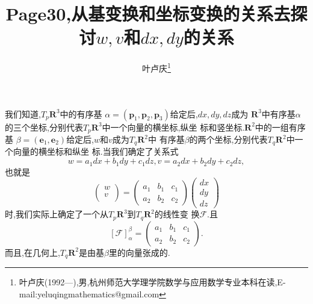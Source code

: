 \documentclass[a4paper]{article}
\begin{document}
\title{\huge{\bf{Page30,从基变换和坐标变换的关系去探讨$w,v$和$dx,dy$的关系}}} \author{\small{叶卢庆\footnote{叶卢庆(1992---),男,杭州师范大学理学院数学与应用数学专业本科在读,E-mail:yeluqingmathematics@gmail.com}}}
\maketitle
我们知道,$T_{p}\mathbf{R}^{3}$中的有序基
$\alpha=(\mathbf{p}_{1},\mathbf{p}_{2},\mathbf{p}_3)$给定后,$dx,dy,dz$成为
$\mathbf{R}^3$中有序基$\alpha$的三个坐标,分别代表$T_p\mathbf{R}^{3}$中一个向量的横坐标,纵坐
标和竖坐标.$\mathbf{R}^2$中的一组有序基
$\beta=(\mathbf{e}_1,\mathbf{e}_2)$给定后,$w$和$v$成为$T_{q}\mathbf{R}^2$中
有序基$\beta$的两个坐标,分别代表$T_{q}\mathbf{R}^2$中一个向量的横坐标和纵坐
标.当我们确定了关系式
$$
w=a_1dx+b_{1}dy+c_1dz,v=a_2dx+b_2dy+c_2dz,
$$
也就是
$$
\begin{pmatrix}
  w\\
v\\
\end{pmatrix}=
\begin{pmatrix}
  a_1&b_1&c_1\\
a_2&b_2&c_2
\end{pmatrix}
\begin{pmatrix}
  dx\\
dy\\
dz
\end{pmatrix}
$$
时,我们实际上确定了一个从$T_p\mathbf{R}^3$到$T_q\mathbf{R}^2$的线性变
换$\mathcal{F}$.且
$$
[\mathcal{F}]_{\alpha}^{\beta}=\begin{pmatrix}
  a_1&b_1&c_1\\
a_2&b_2&c_2
\end{pmatrix}.
$$
而且,在几何上,$T_q\mathbf{R}^2$是由基$\beta$里的向量张成的.
\end{document}
